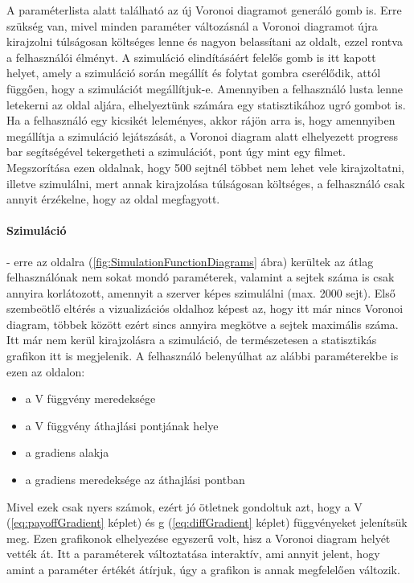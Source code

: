 A paraméterlista alatt található az új Voronoi diagramot generáló gomb is. Erre szükség van, mivel minden paraméter változásnál a Voronoi diagramot újra kirajzolni túlságosan költséges lenne és nagyon belassítani az oldalt, ezzel rontva a felhasználói élményt. A szimuláció elindításáért felelős gomb is itt kapott helyet, amely a szimuláció során megállít és folytat gombra cserélődik, attól függően, hogy a szimulációt megállítjuk-e. Amennyiben a felhasználó lusta lenne letekerni az oldal aljára, elhelyeztünk számára egy statisztikához ugró gombot is. Ha a felhasználó egy kicsikét leleményes, akkor rájön arra is, hogy amennyiben megállítja a szimuláció lejátszását, a Voronoi diagram alatt elhelyezett progress bar segítségével tekergetheti a szimulációt, pont úgy mint egy filmet.
Megszorítása ezen oldalnak, hogy 500 sejtnél többet nem lehet vele kirajzoltatni, illetve szimulálni, mert annak kirajzolása túlságosan költséges, a felhasználó csak annyit érzékelne, hogy az oldal megfagyott.

\paragraph{Szimuláció}- erre az oldalra (\ref{fig:SimulationFunctionDiagrams} ábra) kerültek az átlag felhasználónak nem sokat mondó paraméterek, valamint a sejtek száma is csak annyira korlátozott, amennyit a szerver képes szimulálni (max. 2000 sejt). Első szembeötlő eltérés a vizualizációs oldalhoz képest az, hogy itt már nincs Voronoi diagram, többek között ezért sincs annyira megkötve a sejtek maximális száma. Itt már nem kerül kirajzolásra a szimuláció, de természetesen a statisztikás grafikon itt is megjelenik. A felhasználó belenyúlhat az alábbi paraméterekbe is ezen az oldalon:
\begin{itemize}
	\item a V függvény meredeksége
	\item a V függvény áthajlási pontjának helye
	\item a gradiens alakja
	\item a gradiens meredeksége az áthajlási pontban
\end{itemize}
Mivel ezek csak nyers számok, ezért jó ötletnek gondoltuk azt, hogy a  V (\ref{eq:payoffGradient} képlet) és g (\ref{eq:diffGradient} képlet) függvényeket jelenítsük meg. Ezen grafikonok elhelyezése egyszerű volt, hisz a Voronoi diagram helyét vették át. Itt a paraméterek változtatása interaktív, ami annyit jelent, hogy amint a paraméter értékét átírjuk, úgy a grafikon is annak megfelelően változik.

